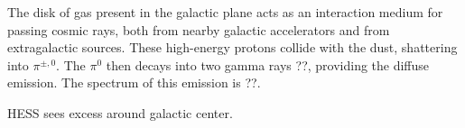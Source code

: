 The disk of gas present in the galactic plane acts as an interaction medium for passing cosmic rays, both from nearby galactic accelerators and from extragalactic sources.
These high-energy protons collide with the dust, shattering into $\pi^{\pm,0}$.
The $\pi^0$ then decays into two gamma rays {\color{red}??}, providing the diffuse emission.
The spectrum of this emission is {\color{red}??}.

HESS sees excess around galactic center.


